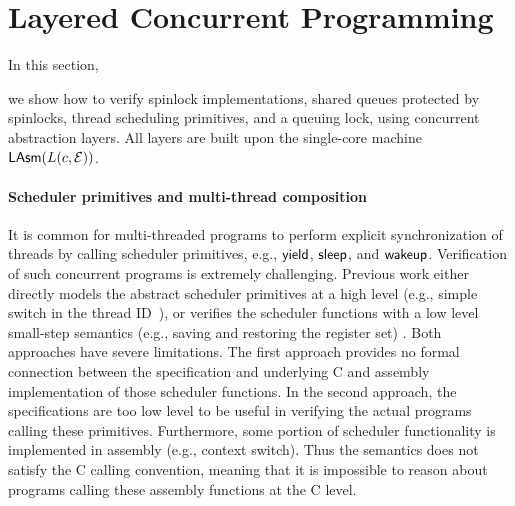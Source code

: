 \section{Layered Concurrent Programming}
\label{sec:prog}



In this section,
we show how to verify spinlock implementations, shared queues protected by spinlocks,
thread scheduling primitives, and a queuing lock,
using concurrent abstraction layers.
All layers are built upon the single-core machine $\mathsf{LAsm}{(L(c,\mathcal{E}))}$.


\paragraph{Scheduler primitives and multi-thread composition}
It is common for multi-threaded programs to perform explicit synchronization
of threads by calling scheduler primitives, e.g., $\mathsf{yield}$, $\mathsf{sleep}$, and $\mathsf{wakeup}$.
Verification of such concurrent programs is extremely challenging.
Previous work either directly models the abstract scheduler primitives at a high level
(e.g., simple switch in the thread ID~\cite{xu16}),
or verifies the scheduler functions with a low level small-step semantics
(e.g., saving and restoring the register set) \cite{dscal15}.
Both approaches have severe limitations. The first approach provides no formal connection
between the specification and underlying C and assembly implementation of those
scheduler functions. In the second approach, the specifications are too low level to
be useful in verifying the actual programs calling these primitives. Furthermore,
some portion of scheduler functionality is implemented in assembly (e.g., context switch).
Thus the semantics does not satisfy the C calling convention, meaning that it 
is impossible to reason about programs calling these assembly functions at the C level.

